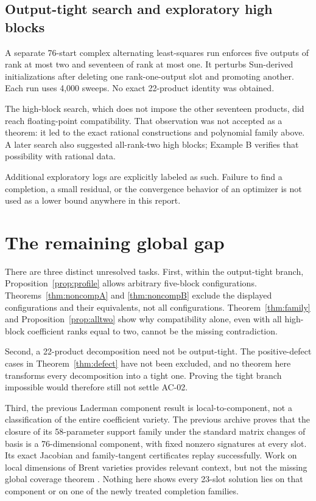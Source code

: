 \documentclass[11pt]{article}
\theoremstyle{definition}\newtheorem{definition}[theorem]{Definition}
\begin{document}
\subsection{Output-tight search and exploratory high blocks}
A separate 76-start complex alternating least-squares run enforces five outputs of rank at most two and seventeen of rank at most one. It perturbs Sun-derived initializations after deleting one rank-one-output slot and promoting another. Each run uses 4,000 sweeps. No exact 22-product identity was obtained.

The high-block search, which does not impose the other seventeen products, did reach floating-point compatibility. That observation was not accepted as a theorem: it led to the exact rational constructions and polynomial family above. A later search also suggested all-rank-two high blocks; Example B verifies that possibility with rational data.

Additional exploratory logs are explicitly labeled as such. Failure to find a completion, a small residual, or the convergence behavior of an optimizer is not used as a lower bound anywhere in this report.

\section{The remaining global gap}\label{sec:gap}
There are three distinct unresolved tasks. First, within the output-tight branch, Proposition~\ref{prop:profile} allows arbitrary five-block configurations. Theorems~\ref{thm:noncompA} and \ref{thm:noncompB} exclude the displayed configurations and their equivalents, not all configurations. Theorem~\ref{thm:family} and Proposition~\ref{prop:alltwo} show why compatibility alone, even with all high-block coefficient ranks equal to two, cannot be the missing contradiction.

Second, a 22-product decomposition need not be output-tight. The positive-defect cases in Theorem~\ref{thm:defect} have not been excluded, and no theorem here transforms every decomposition into a tight one. Proving the tight branch impossible would therefore still not settle AC-02.

Third, the previous Laderman component result is local-to-component, not a classification of the entire coefficient variety. The previous archive proves that the closure of its 58-parameter support family under the standard matrix changes of basis is a 76-dimensional component, with fixed nonzero signatures at every slot. Its exact Jacobian and family-tangent certificates replay successfully. Work on local dimensions of Brent varieties provides relevant context, but not the missing global coverage theorem \cite{local}. Nothing here shows every 23-slot solution lies on that component or on one of the newly treated completion families.
\end{document}
